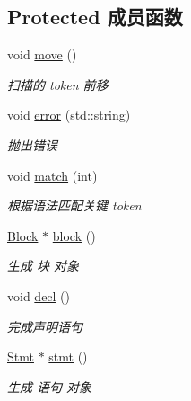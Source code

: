 \subsection*{Protected 成员函数}
\begin{DoxyCompactItemize}
\item 
\mbox{\label{class_parser_ae6cc5bf3ee250c954a36bd16f7559d79}} 
void \hyperlink{class_parser_ae6cc5bf3ee250c954a36bd16f7559d79}{move} ()
\begin{DoxyCompactList}\small\item\em 扫描的 token 前移 \end{DoxyCompactList}\item 
\mbox{\label{class_parser_a0915f6c61a1a70038a8608ff7a823b5a}} 
void \hyperlink{class_parser_a0915f6c61a1a70038a8608ff7a823b5a}{error} (std\+::string)
\begin{DoxyCompactList}\small\item\em 抛出错误 \end{DoxyCompactList}\item 
\mbox{\label{class_parser_a009517efe4fe90b136071179beb32360}} 
void \hyperlink{class_parser_a009517efe4fe90b136071179beb32360}{match} (int)
\begin{DoxyCompactList}\small\item\em 根据语法匹配关键 token \end{DoxyCompactList}\item 
\hyperlink{class_block}{Block} $\ast$ \hyperlink{class_parser_a2e96322fd6d40261ab256a726634c1b3}{block} ()
\begin{DoxyCompactList}\small\item\em 生成 块 对象 \end{DoxyCompactList}\item 
void \hyperlink{class_parser_a44a52c6402e86b0a200e02b516f8e9fe}{decl} ()
\begin{DoxyCompactList}\small\item\em 完成声明语句 \end{DoxyCompactList}\item 
\mbox{\label{class_parser_ab1ae72a37dbe2118ab65ad8f4dec4630}} 
\hyperlink{class_stmt}{Stmt} $\ast$ \hyperlink{class_parser_ab1ae72a37dbe2118ab65ad8f4dec4630}{stmt} ()
\begin{DoxyCompactList}\small\item\em 生成 语句 对象 \end{DoxyCompactList}\item 

\end{DoxyCompactItemize}
